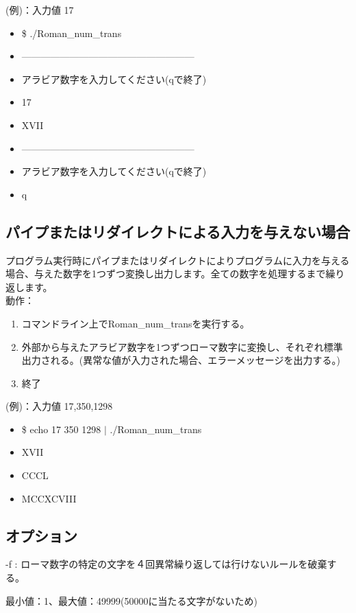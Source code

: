 \documentclass{jsarticle}
\begin{document}
{(例)：入力値 17
\begin{itemize}
\item[] \$ ./Roman\_num\_trans
\item[] ------------------------------------------------------
\item[] アラビア数字を入力してください(qで終了)
\item[] 17
\item[] XVII
\item[] ------------------------------------------------------
\item[] アラビア数字を入力してください(qで終了)
\item[] q
\end{itemize}

\newpage
\subsection{パイプまたはリダイレクトによる入力を与えない場合}
プログラム実行時にパイプまたはリダイレクトによりプログラムに入力を与える場合、与えた数字を1つずつ変換し出力します。全ての数字を処理するまで繰り返します。\\

動作：
\begin{enumerate}
  \item コマンドライン上でRoman\_num\_transを実行する。
  \item 外部から与えたアラビア数字を1つずつローマ数字に変換し、それぞれ標準出力される。(異常な値が入力された場合、エラーメッセージを出力する。) 
  \item 終了\\
\end{enumerate}

(例)：入力値 17,350,1298
\begin{itemize}
\item[] \$ echo 17 350 1298 $|$ ./Roman\_num\_trans
\item[] XVII
\item[] CCCL
\item[] MCCXCVIII
\end{itemize}

\subsection{オプション}
-f : ローマ数字の特定の文字を４回異常繰り返しては行けないルールを破棄する。

最小値：1、最大値：49999(50000に当たる文字がないため)

}
\end{document}
